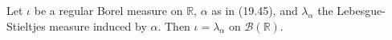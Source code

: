 Let $\iota$ be a regular Borel measure on $\mathbb{R}$, $\alpha$ as in (19.45), and $\lambda_\alpha$ the Lebesgue-Stieltjes measure induced by $\alpha$. Then $\iota = \lambda_\alpha$ on $\mathcal{B}(\mathbb{R})$.
